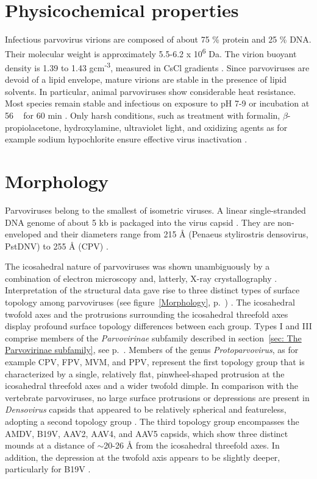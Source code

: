 \section{Physicochemical properties}
Infectious parvovirus virions are composed of about 75 \% protein and 25 \% DNA. Their molecular weight is approximately 5.5-6.2 x 10\textsuperscript{6} Da. The virion buoyant density is 1.39 to 1.43 gcm\textsuperscript{-3}, measured in CsCl gradients \cite{CsCl, pmid4317344}. Since parvoviruses are devoid of a lipid envelope, mature virions are stable in the presence of lipid solvents. In particular, animal parvoviruses show considerable heat resistance. Most species remain stable and infectious on exposure to pH 7-9 or incubation at 56 \textcelsius~ for 60 min \cite{pmid12935806, pmid12385412, pmid17880601, pmid19039515}. Only harsh conditions, such as treatment with formalin, $\beta$-propiolacetone, hydroxylamine, ultraviolet light, and oxidizing agents as for example sodium hypochlorite ensure effective virus inactivation \cite{pmid4213983, pmid3416941, pmid7848502, pmid1520981}.    


\section{Morphology}
\label{sec:Morphology}

Parvoviruses belong to the smallest of isometric viruses. A linear single-stranded DNA genome of about 5 kb is packaged into the virus capsid \cite{pmid4975639, pmid5264145, pmid5429749}. They are non-enveloped and their diameters range from 215 \r{A} (Penaeus stylirostris densovirus, PstDNV) to 255 \r{A} (CPV) \cite{pmid10497831, icvt}. 

The icosahedral nature of parvoviruses was shown unambiguously by a combination of electron microscopy and, latterly, X-ray crystallography \cite{pmid2006420}. Interpretation of the structural data gave rise to three distinct types of surface topology among parvoviruses (see figure~\ref{Morphology}, p.~\pageref{Morphology}) \cite{pmid15795290}. The icosahedral twofold axes and the protrusions surrounding the icosahedral threefold axes display profound surface topology differences between each group. Types I and III comprise members of the \textit{Parvovirinae} subfamily described in section~\ref{sec: The Parvovirinae subfamily}, see p.~\pageref{sec: The Parvovirinae subfamily}. Members of the genus \textit{Protoparvovirus}, as for example CPV, FPV, MVM, and PPV, represent the first topology group that is characterized by a single, relatively flat, pinwheel-shaped protrusion at the icosahedral threefold axes and a wider twofold dimple. In comparison with the vertebrate parvoviruses, no large surface protrusions or depressions are present in \textit{Densovirus} capsids that appeared to be relatively spherical and featureless, adopting a second topology group \cite{pmid15769470, pmid9817847}. The third topology group encompasses the AMDV, B19V, AAV2, AAV4, and AAV5 capsids, which show three distinct mounds at a distance of $\sim$20-26 \r{A} from the icosahedral threefold axes. In addition, the depression at the twofold axis appears to be slightly deeper, particularly for B19V \cite{pmid20375175, pmid12136130, tropism}.        

